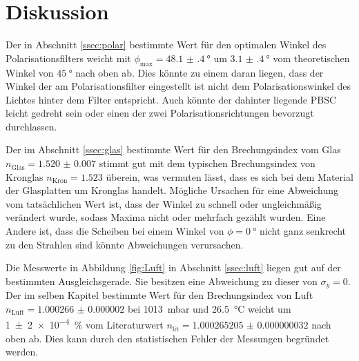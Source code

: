 
\section{Diskussion}
\label{sec:Diskussion}
Der in Abschnitt \ref{ssec:polar} bestimmte Wert für den optimalen Winkel des Polarisationsfilters weicht mit $\phi_\text{max}=\SI{48.1(4)}{\degree}$ um $\SI{3.1(4)}{\degree}$ vom theoretischen Winkel von $\SI{45}{\degree}$ nach oben ab. Dies könnte zu einem daran liegen, dass der Winkel der am Polarisationsfilter eingestellt ist nicht dem Polarisationswinkel des Lichtes hinter dem Filter entspricht. Auch könnte der dahinter liegende PBSC leicht gedreht sein oder einen der zwei Polarisationsrichtungen bevorzugt durchlassen.

Der im Abschnitt \ref{ssec:glas} bestimmte Wert für den Brechungsindex vom Glas $n_\text{Glas}=\num{1.520(7)}$ stimmt gut mit dem typischen Brechungsindex von Kronglas $n_\text{Kron}=\num{1.523}$ \cite{nKron} überein, was vermuten lässt, dass es sich bei dem Material der Glasplatten um Kronglas handelt. Mögliche Ursachen für eine Abweichung vom tatsächlichen Wert ist, dass der Winkel zu schnell oder ungleichmäßig verändert wurde, sodass Maxima nicht oder mehrfach gezählt wurden. Eine Andere ist, dass die Scheiben bei einem Winkel von $\phi=\SI{0}{\degree}$ nicht ganz senkrecht zu den Strahlen sind könnte Abweichungen verursachen.

Die Messwerte in Abbildung \ref{fig:Luft} in Abschnitt \ref{ssec:luft} liegen gut auf der bestimmten Ausgleichsgerade. Sie besitzen eine Abweichung zu dieser von $\sigma_y=\num{0}$. Der im selben Kapitel bestimmte Wert für den Brechungsindex von Luft $n_\text{Luft}=\num{1.000266(2)}$ bei \SI{1013}{\milli\bar} und \SI{26.5}{\degreeCelsius} weicht um \SI{1(2)e-4}{\percent} vom Literaturwert $n_\text{lit}=\num{1.000265205(32)}$ \cite{nist} nach oben ab. Dies kann durch den statistischen Fehler der Messungen begründet werden.



